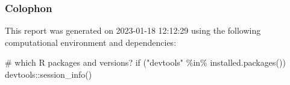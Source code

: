 \documentclass[
  super,
  preprint,
  3p]{elsarticle}
\newenvironment{Shaded}{\begin{snugshade}}{\end{snugshade}}
\newcommand{\CommentTok}[1]{\textcolor[rgb]{0.37,0.37,0.37}{#1}}
\newcommand{\ControlFlowTok}[1]{\textcolor[rgb]{0.00,0.23,0.31}{#1}}
\newcommand{\FunctionTok}[1]{\textcolor[rgb]{0.28,0.35,0.67}{#1}}
\newcommand{\NormalTok}[1]{\textcolor[rgb]{0.00,0.23,0.31}{#1}}
\newcommand{\SpecialCharTok}[1]{\textcolor[rgb]{0.37,0.37,0.37}{#1}}
\newcommand{\StringTok}[1]{\textcolor[rgb]{0.13,0.47,0.30}{#1}}
\begin{document}
\hypertarget{colophon}{%
\subsubsection{Colophon}\label{colophon}}

This report was generated on 2023-01-18 12:12:29 using the following
computational environment and dependencies:

\begin{Shaded}
\begin{Highlighting}[]
\CommentTok{\# which R packages and versions?}
\ControlFlowTok{if}\NormalTok{ (}\StringTok{"devtools"} \SpecialCharTok{\%in\%} \FunctionTok{installed.packages}\NormalTok{()) devtools}\SpecialCharTok{::}\FunctionTok{session\_info}\NormalTok{()}
\end{Highlighting}
\end{Shaded}
\end{document}
